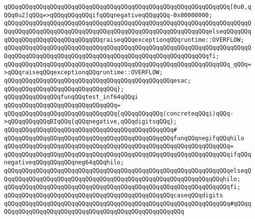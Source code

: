 \newline
\verb|qQQqqQQqqQQqqQQqqQQqqQQqqQQqqQQqqQQqqQQqqQQqqQQqqQQqqQQqqQQqqQQq[0u0,qQQq0u2]qQQq=>qQQqqQQqqQQqifqQQqnegativeqQQqqQQq-0x80000000;|\newline
\verb|qQQqqQQqqQQqqQQqqQQqqQQqqQQqqQQqqQQqqQQqqQQqqQQqqQQqqQQqqQQqqQQqqQQqqQQqqQQqqQQqqQQqqQQqqQQqqQQqqQQqqQQqqQQqqQQqqQQqqQQqqQQqqQQqelseqQQqqQQqqQQqqQQqqQQqqQQqqQQqqQQqqQQqraiseqQQqexceptionqQQqruntime::OVERFLOW;|\newline
\verb|qQQqqQQqqQQqqQQqqQQqqQQqqQQqqQQqqQQqqQQqqQQqqQQqqQQqqQQqqQQqqQQqqQQqqQQqqQQqqQQqqQQqqQQqqQQqqQQqqQQqqQQqqQQqqQQqqQQqqQQqqQQqqQQqfi;|\newline
\newline
\verb|qQQqqQQqqQQqqQQqqQQqqQQqqQQqqQQqqQQqqQQqqQQqqQQqqQQqqQQqqQQqqQQq_qQQq=>qQQqraiseqQQqexceptionqQQqruntime::OVERFLOW;|\newline
\verb|qQQqqQQqqQQqqQQqqQQqqQQqqQQqqQQqqQQqqQQqqQQqqQQqesac;|\newline
\verb|qQQqqQQqqQQqqQQqqQQqqQQqqQQqqQQq};|\newline
\newline
\verb|qQQqqQQqqQQqqQQqfunqQQqtest_inf64qQQqi|\newline
\verb|qQQqqQQqqQQqqQQqqQQqqQQqqQQqqQQq=|\newline
\verb|qQQqqQQqqQQqqQQqqQQqqQQqqQQqqQQq{qQQqqQQqqQQq(concreteqQQqi)qQQq->qQQqqQQqqQQqBIqQQq{qQQqnegative,qQQqdigitsqQQq};|\newline
\verb|qQQqqQQqqQQqqQQqqQQqqQQqqQQqqQQqqQQqqQQqqQQqqQQq#|\newline
\verb|qQQqqQQqqQQqqQQqqQQqqQQqqQQqqQQqqQQqqQQqqQQqqQQqfunqQQqnegifqQQqhilo|\newline
\verb|qQQqqQQqqQQqqQQqqQQqqQQqqQQqqQQqqQQqqQQqqQQqqQQqqQQqqQQqqQQqqQQq=|\newline
\verb|qQQqqQQqqQQqqQQqqQQqqQQqqQQqqQQqqQQqqQQqqQQqqQQqqQQqqQQqqQQqqQQqifqQQqnegativeqQQqqQQqqQQqneg64qQQqhilo;|\newline
\verb|qQQqqQQqqQQqqQQqqQQqqQQqqQQqqQQqqQQqqQQqqQQqqQQqqQQqqQQqqQQqqQQqelseqQQqqQQqqQQqqQQqqQQqqQQqqQQqqQQqqQQqqQQqqQQqqQQqqQQqqQQqqQQqqQQqhilo;|\newline
\verb|qQQqqQQqqQQqqQQqqQQqqQQqqQQqqQQqqQQqqQQqqQQqqQQqqQQqqQQqqQQqqQQqfi;|\newline
\newline
\verb|qQQqqQQqqQQqqQQqqQQqqQQqqQQqqQQqqQQqqQQqqQQqqQQqcaseqQQqdigits|\newline
\verb|qQQqqQQqqQQqqQQqqQQqqQQqqQQqqQQqqQQqqQQqqQQqqQQqqQQqqQQqqQQqqQQq#qQQqqQQqqQQqqQQqqQQqqQQqqQQqqQQqqQQqqQQqqQQqqQQqqQQqqQQq|\newline
